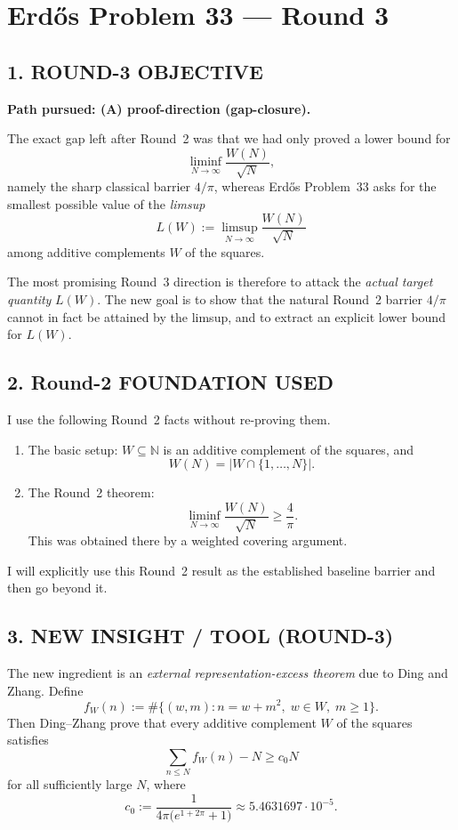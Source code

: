 \section{Erd\H{o}s Problem 33 --- Round 3}

\subsection*{1. ROUND-3 OBJECTIVE}

\textbf{Path pursued: (A) proof-direction (gap-closure).}

The exact gap left after Round~2 was that we had only proved a lower bound for
\[
\liminf_{N\to\infty}\frac{W(N)}{\sqrt N},
\]
namely the sharp classical barrier \(4/\pi\), whereas Erd\H{o}s Problem~33 asks for the smallest possible value of the \emph{limsup}
\[
L(W):=\limsup_{N\to\infty}\frac{W(N)}{\sqrt N}
\]
among additive complements \(W\) of the squares.

The most promising Round~3 direction is therefore to attack the \emph{actual target quantity} \(L(W)\). The new goal is to show that the natural Round~2 barrier \(4/\pi\) cannot in fact be attained by the limsup, and to extract an explicit lower bound for \(L(W)\).

\subsection*{2. Round-2 FOUNDATION USED}

I use the following Round~2 facts without re-proving them.

\begin{enumerate}
\item The basic setup: \(W\subseteq \mathbb N\) is an additive complement of the squares, and
\[
W(N)=|W\cap\{1,\dots,N\}|.
\]

\item The Round~2 theorem:
\[
\liminf_{N\to\infty}\frac{W(N)}{\sqrt N}\ge \frac{4}{\pi}.
\]
This was obtained there by a weighted covering argument.
\end{enumerate}

I will explicitly use this Round~2 result as the established baseline barrier and then go beyond it.

\subsection*{3. NEW INSIGHT / TOOL (ROUND-3)}

The new ingredient is an \emph{external representation-excess theorem} due to Ding and Zhang. Define
\[
f_W(n):=\#\{(w,m):n=w+m^2,\; w\in W,\; m\ge 1\}.
\]
Then Ding--Zhang prove that every additive complement \(W\) of the squares satisfies
\[
\sum_{n\le N} f_W(n)-N\ge c_0 N
\]
for all sufficiently large \(N\), where
\[
c_0:=\frac{1}{4\pi\bigl(e^{1+2\pi}+1\bigr)}\approx 5.4631697\cdot 10^{-5}.
\]

